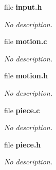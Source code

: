 \begin{DoxyCompactItemize}
file \textbf{ input.\+h}
\begin{DoxyCompactList}\small\item\em No description. \end{DoxyCompactList}\item 
file \textbf{ motion.\+c}
\begin{DoxyCompactList}\small\item\em No description. \end{DoxyCompactList}\item 
file \textbf{ motion.\+h}
\begin{DoxyCompactList}\small\item\em No description. \end{DoxyCompactList}\item 
file \textbf{ piece.\+c}
\begin{DoxyCompactList}\small\item\em No description. \end{DoxyCompactList}\item 
file \textbf{ piece.\+h}
\begin{DoxyCompactList}\small\item\em No description. \end{DoxyCompactList}\end{DoxyCompactItemize}
